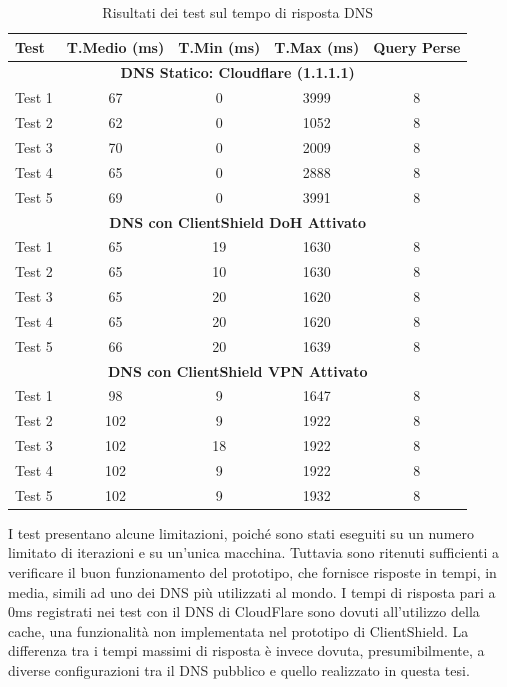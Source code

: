 \documentclass[12pt,a4paper,openright,twoside]{book}
\begin{document}
\begin{table}[h]
	\centering
	\renewcommand{\arraystretch}{1.3} %
	\setlength{\tabcolsep}{10pt} %
	\begin{tabular}{lcccc}
		\toprule
		\textbf{Test} & \textbf{T.Medio (ms)} & \textbf{T.Min (ms)} & \textbf{T.Max (ms)} & \textbf{Query Perse} \\
		\midrule
		\multicolumn{5}{c}{\textbf{DNS Statico: Cloudflare (1.1.1.1)}} \\
		\midrule
		Test 1 & 67 & 0 & 3999 & 8 \\
		Test 2 & 62 & 0 & 1052 & 8 \\
		Test 3 & 70 & 0 & 2009 & 8 \\
		Test 4 & 65 & 0 & 2888 & 8 \\
		Test 5 & 69 & 0 & 3991 & 8 \\
		\midrule
		\multicolumn{5}{c}{\textbf{DNS con ClientShield DoH Attivato}} \\
		\midrule
		Test 1 & 65 & 19 & 1630 & 8 \\
		Test 2 & 65 & 10 & 1630 & 8 \\
		Test 3 & 65 & 20 & 1620 & 8 \\
		Test 4 & 65 & 20 & 1620 & 8 \\
		Test 5 & 66 & 20 & 1639 & 8 \\
		\midrule
		\multicolumn{5}{c}{\textbf{DNS con ClientShield VPN Attivato}} \\
		\midrule
		Test 1 & 98 & 9 & 1647 & 8 \\
		Test 2 & 102 & 9 & 1922 & 8 \\
		Test 3 & 102 & 18 & 1922 & 8 \\
		Test 4 & 102 & 9 & 1922 & 8 \\
		Test 5 & 102 & 9 & 1932 & 8 \\
		\bottomrule
	\end{tabular}
	\caption{Risultati dei test sul tempo di risposta DNS}
	\label{tab:dns-tests}
\end{table}
I test presentano alcune limitazioni, poiché sono stati eseguiti su un numero limitato di iterazioni e su un'unica macchina.
Tuttavia sono ritenuti sufficienti a verificare il buon funzionamento del prototipo, che fornisce risposte in tempi, in media, simili ad uno dei \gls{DNS} più utilizzati al mondo.
I tempi di risposta pari a 0ms registrati nei test con il \gls{DNS} di CloudFlare sono dovuti all'utilizzo della cache, una funzionalità non implementata nel prototipo di ClientShield.  
La differenza tra i tempi massimi di risposta è invece dovuta, presumibilmente, a diverse configurazioni tra il \gls{DNS} pubblico e quello realizzato in questa tesi.
\end{document}
